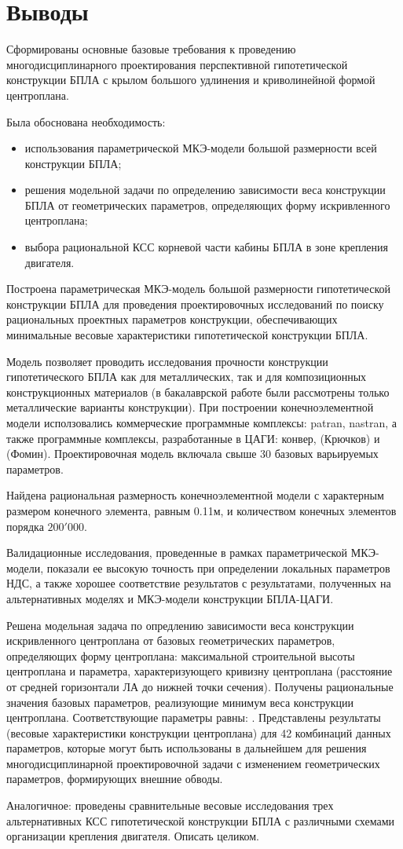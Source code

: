 \chapter*{Выводы}

Сформированы основные базовые требования к проведению многодисциплинарного проектирования перспективной гипотетической конструкции БПЛА с крылом большого удлинения и криволинейной формой центроплана. 

Была обоснована необходимость:
\begin{itemize}
\item использования параметрической МКЭ-модели большой размерности всей конструкции БПЛА;
\item решения модельной задачи по определению зависимости веса конструкции БПЛА от геометрических параметров, определяющих форму искривленного центроплана;
\item выбора рациональной КСС корневой части кабины БПЛА в зоне крепления двигателя.
\end{itemize}

Построена параметрическая МКЭ-модель большой размерности гипотетической конструкции БПЛА для проведения проектировочных исследований по поиску рациональных проектных параметров конструкции, обеспечивающих минимальные весовые характеристики гипотетической конструкции БПЛА. 

Модель позволяет проводить исследования прочности конструкции гипотетического БПЛА как для металлических, так и для композиционных конструкционных материалов (в бакалаврской работе были рассмотрены только металлические варианты конструкции). При построении конечноэлементной модели исползовались коммерческие программные комплексы: patran, nastran, а также программные комплексы, разработанные в ЦАГИ: конвер, (Крючков) и (Фомин).
Проектировочная модель  включала свыше 30 базовых варьируемых параметров. 

Найдена рациональная размерность конечноэлементной модели с характерным размером конечного элемента, равным 0.11м, и количеством конечных элементов порядка $200'000$. 

Валидационные исследования, проведенные в рамках параметрической МКЭ-модели, показали ее высокую точность при определении локальных параметров НДС, а также хорошее соответствие результатов с результатами, полученных на альтернативных моделях и МКЭ-модели конструкции БПЛА-ЦАГИ. 


Решена модельная задача по опредлению зависимости веса конструкции искривленного центроплана от базовых геометрических параметров, определяющих форму центроплана: максимальной строительной высоты центроплана и параметра, характеризующего кривизну центроплана (расстояние от средней горизонтали ЛА до нижней точки сечения). Получены рациональные значения базовых параметров, реализующие минимум веса конструкции центроплана. Соответствующие параметры равны: . Представлены результаты (весовые характеристики конструкции центроплана) для 42 комбинаций данных параметров, которые могут быть использованы в дальнейшем для решения многодисциплинарной проектировочной задачи с изменением геометрических параметров, формирующих внешние обводы. 

Аналогичное: проведены сравнительные весовые исследования трех альтернативных КСС гипотетической конструкции БПЛА с различными схемами организации крепления двигателя. Описать целиком. 